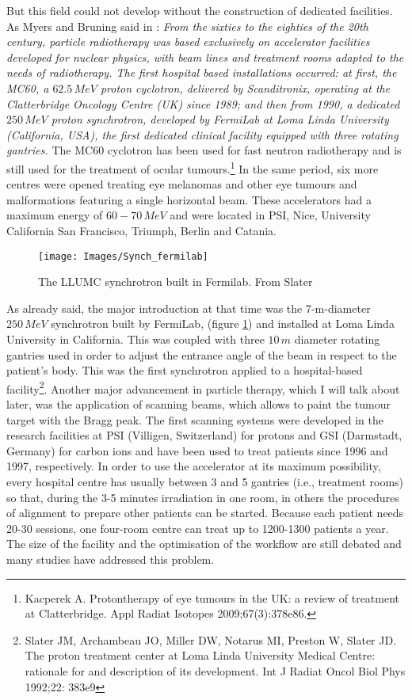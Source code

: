 \documentclass[12pt, a4paper, twoside]{book}
\begin{document}
But this field could not develop without the construction of dedicated facilities. 
As Myers and Bruning said in \cite{mye:acc}: \emph{From the sixties to the eighties of the 20th century, particle radiotherapy was based exclusively on accelerator facilities developed for nuclear physics, with beam lines and treatment rooms adapted to the needs of radiotherapy. The first hospital based installations occurred: at first, the MC60, a $62.5\,MeV$ proton cyclotron, delivered by Scanditronix, operating at the Clatterbridge Oncology Centre (UK) since 1989; and then from 1990, a dedicated $250\,MeV$ proton synchrotron, developed by FermiLab at Loma Linda University (California, USA), the first dedicated clinical facility equipped with three rotating gantries.}
The MC60 cyclotron has been used for fast neutron radiotherapy and is still used for the treatment of ocular tumours.\footnote{Kacperek A. Protontherapy of eye tumours in the UK: a review of treatment at
Clatterbridge. Appl Radiat Isotopes 2009;67(3):378e86.} In the same period, six more centres were opened treating eye melanomas and other eye tumours and malformations featuring a single horizontal beam. These accelerators had a maximum energy of $60-70\,MeV$ and were located in PSI, Nice, University California San Francisco, Triumph, Berlin and Catania.
\begin{figure}[!t]
\centering
{\texttt{[image: Images/Synch\_fermilab]}}
\caption{The LLUMC synchrotron built in Fermilab. From Slater \cite{jd:llu}}
\label{fig:synchF}
\end{figure}
As already said, the major introduction at that time was the 7-m-diameter $250\,MeV$ synchrotron built by FermiLab, (figure \ref{fig:synchF}) and installed at Loma Linda University in California. This was coupled with three $10\,m$ diameter rotating gantries used in order to adjust the entrance angle of the beam in respect to the patient's body.
This was the first synchrotron applied to a hospital-based facility\footnote{Slater JM, Archambeau JO, Miller DW, Notarus MI, Preston W, Slater JD. The proton treatment center at Loma Linda University Medical Centre: rationale
for and description of its development. Int J Radiat Oncol Biol Phys 1992;22: 383e9}.
Another major advancement in particle therapy, which I will talk about later, was the application of scanning beams, which allows to paint the tumour target with the Bragg peak.
The first scanning systems were developed in the research facilities at PSI (Villigen, Switzerland) for protons and GSI (Darmstadt, Germany) for carbon ions and have been used to treat patients since 1996 and 1997, respectively.
In order to use the accelerator at its maximum possibility, every hospital centre has usually between 3 and 5 gantries (i.e., treatment rooms) so that, during the 3-5 minutes irradiation in one room, in others the procedures of alignment to prepare other patients can be started. Because each patient needs 20-30 sessions, one four-room centre can treat up to 1200-1300 patients a year. The size of the facility and the optimisation of the workflow are still debated and many studies have addressed this problem.
\end{document}
